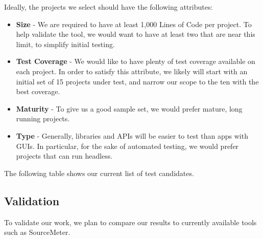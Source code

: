 Ideally, the projects we select should have the following attributes:

\begin{itemize}
\item \textbf{Size} - We are required to have at least 1,000 Lines of Code per project. To help validate the tool, we would want to have at least two that are near this limit, to simplify initial testing.
\item \textbf{Test Coverage} - We would like to have plenty of test coverage available on each project. In order to satisfy this attribute, we likely will start with an initial set of 15 projects under test, and narrow our scope to the ten with the best coverage.
\item \textbf{Maturity} - To give us a good sample set, we would prefer mature, long running projects.
\item \textbf{Type} - Generally, libraries and APIs will be easier to test than apps with GUIs. In particular, for the sake of automated testing, we would prefer projects that can run headless.
\end{itemize}

The following table shows our current list of test candidates.



\subsection{Validation}

To validate our work, we plan to compare our results to currently available tools such as SourceMeter. 
